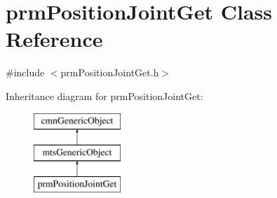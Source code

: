 \hypertarget{classprm_position_joint_get}{}\section{prm\+Position\+Joint\+Get Class Reference}
\label{classprm_position_joint_get}


{\ttfamily \#include $<$prm\+Position\+Joint\+Get.\+h$>$}

Inheritance diagram for prm\+Position\+Joint\+Get\+:\begin{figure}[H]
\begin{center}
\leavevmode
\includegraphics[height=3.000000cm]{d3/d01/classprm_position_joint_get}
\end{center}
\end{figure}
